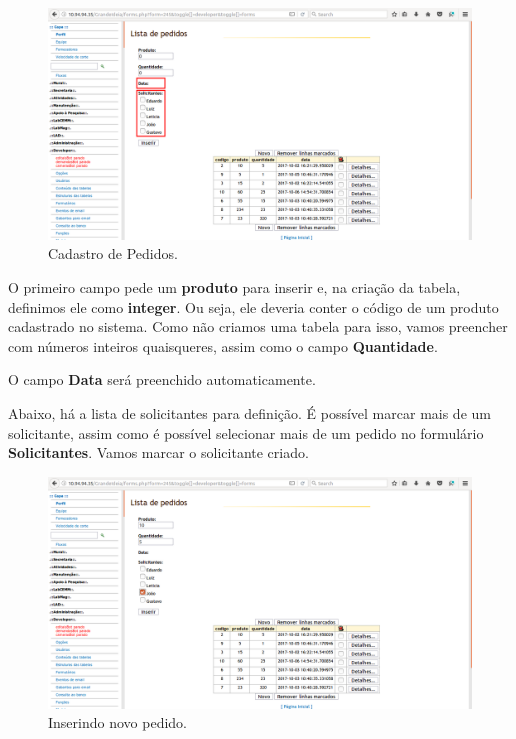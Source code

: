 \documentclass[9pt]{report}
\begin{document}
{       \begin{figure}[H]
        \includegraphics[width=\textwidth]{2_Formularios/4_Relacionamento_N_N/47.png}
        \caption{Cadastro de  Pedidos.}
        \label{fig:formscadastropedido}
       \end{figure}

       O primeiro campo pede um \textbf{produto} para inserir e, na
       criação da tabela, definimos ele como \textbf{integer}. Ou
       seja, ele deveria conter o código de um produto cadastrado no
       sistema. Como não criamos uma tabela para isso, vamos
       preencher com números inteiros quaisqueres, assim como o campo
       \textbf{Quantidade}.

       O campo \textbf{Data} será preenchido automaticamente.

       Abaixo, há a lista de solicitantes para definição. É possível
       marcar mais de um solicitante, assim como é possível
       selecionar mais de um pedido no formulário
       \textbf{Solicitantes}. Vamos marcar o solicitante criado.

       \begin{figure}[H]
        \includegraphics[width=\textwidth]{2_Formularios/4_Relacionamento_N_N/48.png}
        \caption{Inserindo novo pedido.}
        \label{fig:formsinsertpedido}
       \end{figure}

}
\end{document}
